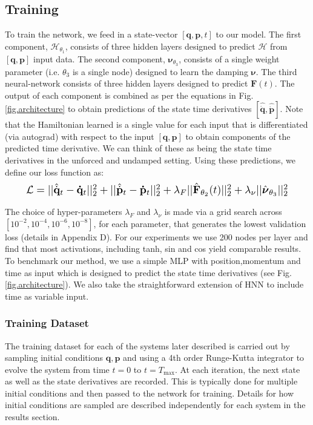 \documentclass[twoside]{article}
\begin{document}
\subsection*{Training}
To train the network, we feed in a state-vector $ [\mathbf{q},\mathbf{p},t]$ to our model. The first component, $\mathcal{H}_{\theta_1}$, consists of three hidden layers designed to predict $\mathcal{H}$ from $[\mathbf{q},\mathbf{p}]$ input data. The second component, $\boldsymbol\nu_{\theta_3}$, consists of a single weight parameter (i.e. $\theta_3$ is a single node) designed to learn the damping $\boldsymbol\nu$. The third neural-network consists of three hidden layers designed to predict $\mathbf{F}(t)$. The output of each component is combined as per the equations in Fig.\ref{fig.architecture} to obtain predictions of the state time derivatives $[\hat{\dot{\mathbf{q}}},\hat{\dot{\mathbf{p}}}]$. Note that the Hamiltonian learned is a single value for each input that is differentiated (via autograd) with respect to the input $[\mathbf{q},\mathbf{p}]$ to obtain components of the predicted time derivative. We can think of these as being the state time derivatives in the unforced and undamped setting. Using these predictions, we define our loss function as:
\begin{equation}
\label{eqn.loss}
\resizebox{0.9\columnwidth}{!}{%
  $\mathcal{L} =|| \hat{\dot{\mathbf{q}}}_t - \mathbf{\dot{q}}_t ||_2^2 +
|| \hat{\dot{\mathbf{p}}}_t -\mathbf{\dot{p}}_t ||_2^2 + \lambda_F|| \hat{\mathbf{F}}_{\theta_2} (t)||_2^2 + \lambda_\nu||\hat{\boldsymbol\nu}_{\theta_3}||_2^2$%
}
\end{equation}

The choice of hyper-parameters $\lambda_F$ and $\lambda_{\nu}$ is made via a grid search across $[10^{-2},10^{-4},10^{-6},10^{-8}]$, for each parameter, that generates the lowest validation loss (details in Appendix D). For our experiments we use 200 nodes per layer and find that most activations, including tanh, sin and cos yield comparable results. To benchmark our method, we use a simple MLP with position,momentum and time as input which is designed to predict the state time derivatives (see Fig.\ref{fig.architecture}). We also take the straightforward extension of HNN to include time as variable input. 
\subsubsection*{Training Dataset}

The training dataset for each of the systems later described is carried out by sampling initial conditions $\mathbf{q},\mathbf{p}$ and using a 4th order Runge-Kutta integrator to evolve the system from time $t=0$ to $t=T_{\max}$. At each iteration, the next state as well as the state derivatives are recorded. This is typically done for multiple initial conditions and then passed to the network for training. Details for how initial conditions are sampled are described independently for each system in the results section.
\end{document}
